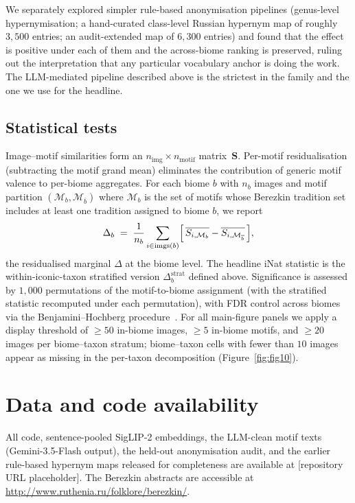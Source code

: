 \documentclass[11pt,a4paper]{article}
\begin{document}
We separately explored simpler rule-based anonymisation pipelines
(genus-level hypernymisation; a hand-curated class-level Russian
hypernym map of roughly $3{,}500$ entries; an audit-extended map
of $6{,}300$ entries) and found that the effect is positive under
each of them and the across-biome ranking is preserved, ruling out
the interpretation that any particular vocabulary anchor is doing
the work. The LLM-mediated pipeline described above is the
strictest in the family and the one we use for the headline.

\subsection*{Statistical tests}

Image--motif similarities form an
$n_{\text{img}} \times n_{\text{motif}}$ matrix~$\mathbf{S}$.
Per-motif residualisation (subtracting the motif grand mean)
eliminates the contribution of generic motif valence to per-biome
aggregates. For each biome $b$ with $n_b$ images and motif
partition $(\mathcal{M}_b, \mathcal{M}_{\overline{b}})$ where
$\mathcal{M}_b$ is the set of motifs whose Berezkin tradition set
includes at least one tradition assigned to biome $b$, we report
\[
\Delta_b \;=\; \frac{1}{n_b}\sum_{i \in \text{imgs}(b)}
        \Bigl[\,\overline{S_{i,\mathcal{M}_b}}
            - \overline{S_{i,\mathcal{M}_{\overline{b}}}}\,\Bigr],
\]
the residualised marginal $\Delta$ at the biome level. The
headline iNat statistic is the within-iconic-taxon stratified
version $\Delta^{\text{strat}}_b$ defined above. Significance is
assessed by $1{,}000$ permutations of the motif-to-biome
assignment (with the stratified statistic recomputed under each
permutation), with FDR control across biomes via the
Benjamini--Hochberg procedure~\citep{benjamini1995controlling}.
For all main-figure panels we apply a display threshold of
$\geq 50$ in-biome images, $\geq 5$ in-biome motifs, and
$\geq 20$ images per biome--taxon stratum; biome--taxon cells
with fewer than $10$ images appear as missing in the per-taxon
decomposition (Figure~\ref{fig:fig10}).

\section*{Data and code availability}
All code, sentence-pooled SigLIP-2 embeddings, the LLM-clean motif
texts (Gemini-3.5-Flash output), the held-out anonymisation audit,
and the earlier rule-based hypernym maps released for completeness
are available at [repository URL placeholder]. The Berezkin
abstracts are accessible at
\url{http://www.ruthenia.ru/folklore/berezkin/}.
\end{document}
